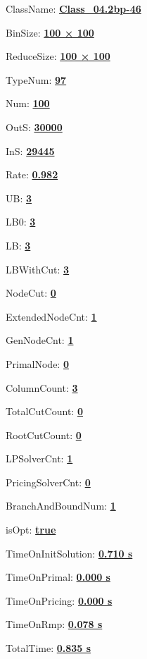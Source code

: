 \documentclass[11pt]{article}
\begin{document}
\pagestyle{empty}


ClassName: \underline{\textbf{Class_04.2bp-46}}
\par
BinSize: \underline{\textbf{100 × 100}}
\par
ReduceSize: \underline{\textbf{100 × 100}}
\par
TypeNum: \underline{\textbf{97}}
\par
Num: \underline{\textbf{100}}
\par
OutS: \underline{\textbf{30000}}
\par
InS: \underline{\textbf{29445}}
\par
Rate: \underline{\textbf{0.982}}
\par
UB: \underline{\textbf{3}}
\par
LB0: \underline{\textbf{3}}
\par
LB: \underline{\textbf{3}}
\par
LBWithCut: \underline{\textbf{3}}
\par
NodeCut: \underline{\textbf{0}}
\par
ExtendedNodeCnt: \underline{\textbf{1}}
\par
GenNodeCnt: \underline{\textbf{1}}
\par
PrimalNode: \underline{\textbf{0}}
\par
ColumnCount: \underline{\textbf{3}}
\par
TotalCutCount: \underline{\textbf{0}}
\par
RootCutCount: \underline{\textbf{0}}
\par
LPSolverCnt: \underline{\textbf{1}}
\par
PricingSolverCnt: \underline{\textbf{0}}
\par
BranchAndBoundNum: \underline{\textbf{1}}
\par
isOpt: \underline{\textbf{true}}
\par
TimeOnInitSolution: \underline{\textbf{0.710 s}}
\par
TimeOnPrimal: \underline{\textbf{0.000 s}}
\par
TimeOnPricing: \underline{\textbf{0.000 s}}
\par
TimeOnRmp: \underline{\textbf{0.078 s}}
\par
TotalTime: \underline{\textbf{0.835 s}}
\par
\newpage
\end{document}
